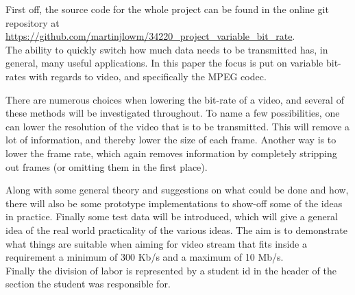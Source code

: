First off, the source code for the whole project can be found in the online git repository at \url{https://github.com/martinjlowm/34220_project_variable_bit_rate}.\\

\noindent The ability to quickly switch how much data needs to be transmitted has, in general, many useful applications. In this paper the focus is put on variable bit-rates with regards to video, and specifically the MPEG codec.

There are numerous choices when lowering the bit-rate of a video, and several of these methods will be investigated throughout. To name a few possibilities, one can lower the resolution of the video that is to be transmitted. This will remove a lot of information, and thereby lower the size of each frame. Another way is to lower the frame rate, which again removes information by completely stripping out frames (or omitting them in the first place).

Along with some general theory and suggestions on what could be done and how, there will also be some prototype implementations to show-off some of the ideas in practice. Finally some test data will be introduced, which will give a general idea of the real world practicality of the various ideas. The aim is to demonstrate what things are suitable when aiming for video stream that fits inside a requirement a minimum of 300 Kb/s and a maximum of 10 Mb/s.\\

Finally the division of labor is represented by a student id in the header of the section the student was responsible for.
